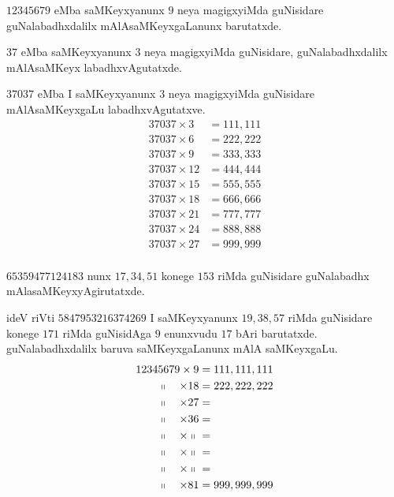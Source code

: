 $12345679$ eMba saMKeyxyanunx $9$ neya magigxyiMda guNisidare guNalabadhxdalilx mAlAsaMKeyxgaLanunx barutatxde.

$37$ eMba saMKeyxyanunx $3$ neya magigxyiMda guNisidare, guNalabadhxdalilx mAlAsaMKeyx labadhxvAgutatxde.

$37037$ eMba I saMKeyxyanunx $3$ neya magigxyiMda guNisidare mAlAsaMKeyxgaLu labadhxvAgutatxve.
\begin{align*}
37037 \times  3&= 111,111 \\
37037 \times  6&= 222,222\\
37037 \times  9&= 333,333\\
37037 \times  12&= 444,444\\
37037 \times  15&= 555,555\\
37037 \times  18&= 666,666\\
37037 \times  21&= 777,777\\
37037 \times  24&= 888,888\\
37037 \times  27&= 999,999\\
\end{align*}

$65359477124183$ nunx $17,34,51$ konege $153$ riMda guNisidare guNalabadhx mAlasaMKeyxyAgirutatxde.

ideV riVti $5847953216374269$ I saMKeyxyanunx $19,38,57$ riMda guNisidare konege $171$ riMda guNisidAga $9$ enunxvudu $17$ bAri barutatxde. guNalabadhxdalilx baruva saMKeyxgaLanunx mAlA saMKeyxgaLu.
\begin{align*}
12345679             \times                 9 &= 111,111,111\\
~~~~\shortparallel~~~\times                18 &=222,222,222\\
~~~~\shortparallel~~~\times                27 &= \\
~~~~\shortparallel~~~\times                36 &=  \\
~~~~\shortparallel~~~\times  \shortparallel~  &= \\
~~~~\shortparallel~~~\times  \shortparallel~  &= \\
~~~~\shortparallel~~~\times  \shortparallel~  &= \\
~~~~\shortparallel~~~\times                 81 &= 999,999,999\\
\end{align*}
